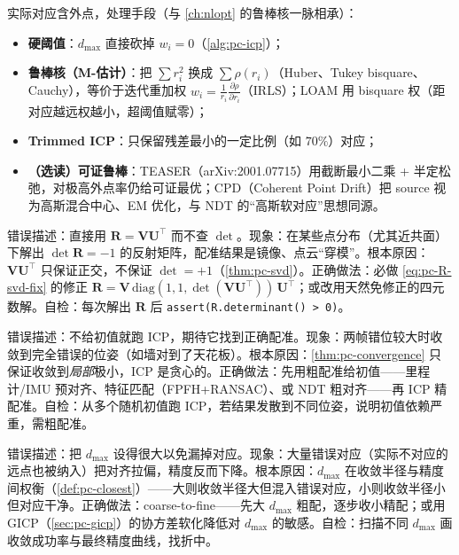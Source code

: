 实际对应含外点，处理手段（与 \cref{ch:nlopt} 的鲁棒核一脉相承）：
\begin{itemize}
  \item \textbf{硬阈值}：$d_{\max}$ 直接砍掉 $w_i=0$（\cref{alg:pc-icp}）；
  \item \textbf{鲁棒核（M-估计）}：把 $\sum r_i^2$ 换成 $\sum\rho(r_i)$（Huber、Tukey bisquare、Cauchy），等价于迭代重加权 $w_i=\frac{1}{r_i}\frac{\partial\rho}{\partial r_i}$（IRLS）；LOAM 用 bisquare 权（距对应越远权越小，超阈值赋零）；
  \item \textbf{Trimmed ICP}：只保留残差最小的一定比例（如 $70\%$）对应；
  \item \textbf{（选读）可证鲁棒}：TEASER\cite{yang2021teaser}（arXiv:2001.07715）用截断最小二乘 + 半定松弛，对极高外点率仍给可证最优；CPD\cite{myronenko2010cpd}（Coherent Point Drift）把 source 视为高斯混合中心、EM 优化，与 NDT 的“高斯软对应”思想同源。
\end{itemize}

\begin{pitfall}
错误描述：直接用 $\mathbf{R}=\mathbf{V}\mathbf{U}^\top$ 而不查 $\det$。现象：在某些点分布（尤其近共面）下解出 $\det\mathbf{R}=-1$ 的反射矩阵，配准结果是镜像、点云“穿模”。根本原因：$\mathbf{V}\mathbf{U}^\top$ 只保证正交，不保证 $\det=+1$（\cref{thm:pc-svd}）。正确做法：必做 \cref{eq:pc-R-svd-fix} 的修正 $\mathbf{R}=\mathbf{V}\,\mathrm{diag}(1,1,\det(\mathbf{V}\mathbf{U}^\top))\,\mathbf{U}^\top$；或改用天然免修正的四元数解。自检：每次解出 $\mathbf{R}$ 后 \texttt{assert(R.\allowbreak determinant() > 0)}。
\end{pitfall}

\begin{pitfall}
错误描述：不给初值就跑 ICP，期待它找到正确配准。现象：两帧错位较大时收敛到完全错误的位姿（如墙对到了天花板）。根本原因：\cref{thm:pc-convergence} 只保证收敛到\emph{局部}极小，ICP 是贪心的。正确做法：先用粗配准给初值——里程计/IMU 预对齐、特征匹配（FPFH+RANSAC）、或 NDT 粗对齐——再 ICP 精配准。自检：从多个随机初值跑 ICP，若结果发散到不同位姿，说明初值依赖严重，需粗配准。
\end{pitfall}

\begin{pitfall}
错误描述：把 $d_{\max}$ 设得很大以免漏掉对应。现象：大量错误对应（实际不对应的远点也被纳入）把对齐拉偏，精度反而下降。根本原因：$d_{\max}$ 在收敛半径与精度间权衡（\cref{def:pc-closest}）——大则收敛半径大但混入错误对应，小则收敛半径小但对应干净。正确做法：coarse-to-fine——先大 $d_{\max}$ 粗配，逐步收小精配；或用 GICP（\cref{sec:pc-gicp}）的协方差软化降低对 $d_{\max}$ 的敏感。自检：扫描不同 $d_{\max}$ 画收敛成功率与最终精度曲线，找折中。
\end{pitfall}

